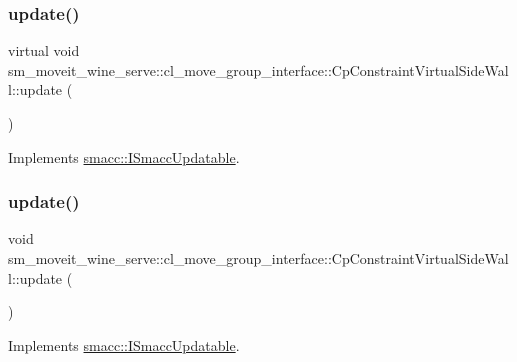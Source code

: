 \subsubsection{\texorpdfstring{update()}{update()}\hspace{0.1cm}{\footnotesize\ttfamily [1/2]}}
{\footnotesize\ttfamily virtual void sm\+\_\+moveit\+\_\+wine\+\_\+serve\+::cl\+\_\+move\+\_\+group\+\_\+interface\+::\+Cp\+Constraint\+Virtual\+Side\+Wall\+::update (\begin{DoxyParamCaption}{ }\end{DoxyParamCaption})\hspace{0.3cm}{\ttfamily [virtual]}}



Implements \hyperlink{classsmacc_1_1ISmaccUpdatable_a84ee0520cbefdb1d412bed54650b028e}{smacc\+::\+I\+Smacc\+Updatable}.

\mbox{\label{classsm__moveit__wine__serve_1_1cl__move__group__interface_1_1CpConstraintVirtualSideWall_a455681238d7baaaa5aa0f1e625864f3a}} 
\subsubsection{\texorpdfstring{update()}{update()}\hspace{0.1cm}{\footnotesize\ttfamily [2/2]}}
{\footnotesize\ttfamily void sm\+\_\+moveit\+\_\+wine\+\_\+serve\+::cl\+\_\+move\+\_\+group\+\_\+interface\+::\+Cp\+Constraint\+Virtual\+Side\+Wall\+::update (\begin{DoxyParamCaption}{ }\end{DoxyParamCaption})\hspace{0.3cm}{\ttfamily [virtual]}}



Implements \hyperlink{classsmacc_1_1ISmaccUpdatable_a84ee0520cbefdb1d412bed54650b028e}{smacc\+::\+I\+Smacc\+Updatable}.



